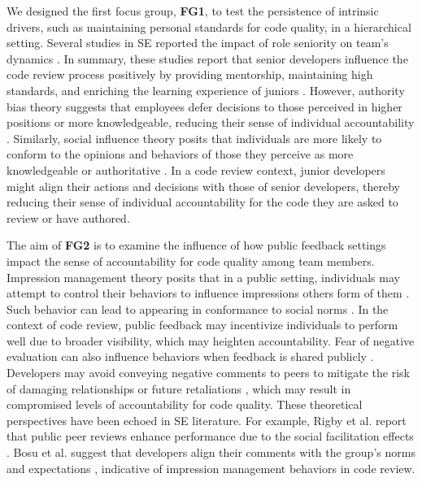 We designed the first focus group, \textbf{FG1}, to test the persistence of intrinsic drivers, such as maintaining personal standards for code quality, in a hierarchical setting. Several studies in SE reported the impact of role seniority on team's dynamics \citep{cunha2021code,sadowski2018modern,bacchelli2013expectations}. In summary, these studies report that senior developers influence the code review process positively by providing mentorship, maintaining high standards, and enriching the learning experience of juniors \citep{cunha2021code,sadowski2018modern,bacchelli2013expectations}. However, authority bias theory suggests that employees defer decisions to those perceived in higher positions or more knowledgeable, reducing their sense of individual accountability \citep{kipnis1972does,milgram1963behavioral}. Similarly, social influence theory posits that individuals are more likely to conform to the opinions and behaviors of those they perceive as more knowledgeable or authoritative \citep{cialdini2004social,asch2016effects}. In a code review context, junior developers might align their actions and decisions with those of senior developers, thereby reducing their sense of individual accountability for the code they are asked to review or have authored.

The aim of \textbf{FG2} is to examine the influence of how public feedback settings impact the sense of accountability for code quality among team members. Impression management theory posits that in a public setting, individuals may attempt to control their behaviors to influence impressions others form of them \citep{bolino2016impression}. Such behavior can lead to appearing in conformance to social norms \citep{bolino2016impression}. In the context of code review, public feedback may incentivize individuals to perform well due to broader visibility, which may heighten accountability. Fear of negative evaluation can also influence behaviors when feedback is shared publicly \citep{watson1969measurement}. Developers may avoid conveying negative comments to peers to mitigate the risk of damaging relationships or future retaliations \citep{kocovski2000social}, which may result in compromised levels of accountability for code quality. These theoretical perspectives have been echoed in SE literature. For example, Rigby et al. report that public peer reviews enhance performance due to the social facilitation effects \citep{rigby2013convergent}. Bosu et al. suggest that developers align their comments with the group's norms and expectations \citep{bosu2015characteristics}, indicative of impression management behaviors in code review.

